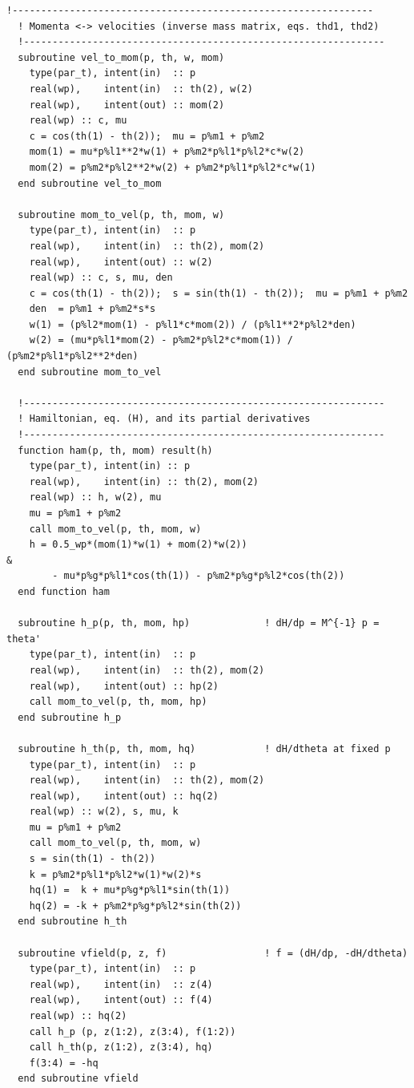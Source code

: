 \documentclass[11pt,a4paper]{book}
\theoremstyle{definition}
\theoremstyle{remark}
\begin{document}
\begin{lstlisting}[language={[95]Fortran},basicstyle=\ttfamily\scriptsize]
  !---------------------------------------------------------------
  ! Momenta <-> velocities (inverse mass matrix, eqs. thd1, thd2)
  !---------------------------------------------------------------
  subroutine vel_to_mom(p, th, w, mom)
    type(par_t), intent(in)  :: p
    real(wp),    intent(in)  :: th(2), w(2)
    real(wp),    intent(out) :: mom(2)
    real(wp) :: c, mu
    c = cos(th(1) - th(2));  mu = p%m1 + p%m2
    mom(1) = mu*p%l1**2*w(1) + p%m2*p%l1*p%l2*c*w(2)
    mom(2) = p%m2*p%l2**2*w(2) + p%m2*p%l1*p%l2*c*w(1)
  end subroutine vel_to_mom

  subroutine mom_to_vel(p, th, mom, w)
    type(par_t), intent(in)  :: p
    real(wp),    intent(in)  :: th(2), mom(2)
    real(wp),    intent(out) :: w(2)
    real(wp) :: c, s, mu, den
    c = cos(th(1) - th(2));  s = sin(th(1) - th(2));  mu = p%m1 + p%m2
    den  = p%m1 + p%m2*s*s
    w(1) = (p%l2*mom(1) - p%l1*c*mom(2)) / (p%l1**2*p%l2*den)
    w(2) = (mu*p%l1*mom(2) - p%m2*p%l2*c*mom(1)) / (p%m2*p%l1*p%l2**2*den)
  end subroutine mom_to_vel

  !---------------------------------------------------------------
  ! Hamiltonian, eq. (H), and its partial derivatives
  !---------------------------------------------------------------
  function ham(p, th, mom) result(h)
    type(par_t), intent(in) :: p
    real(wp),    intent(in) :: th(2), mom(2)
    real(wp) :: h, w(2), mu
    mu = p%m1 + p%m2
    call mom_to_vel(p, th, mom, w)
    h = 0.5_wp*(mom(1)*w(1) + mom(2)*w(2))                              &
        - mu*p%g*p%l1*cos(th(1)) - p%m2*p%g*p%l2*cos(th(2))
  end function ham

  subroutine h_p(p, th, mom, hp)             ! dH/dp = M^{-1} p = theta'
    type(par_t), intent(in)  :: p
    real(wp),    intent(in)  :: th(2), mom(2)
    real(wp),    intent(out) :: hp(2)
    call mom_to_vel(p, th, mom, hp)
  end subroutine h_p

  subroutine h_th(p, th, mom, hq)            ! dH/dtheta at fixed p
    type(par_t), intent(in)  :: p
    real(wp),    intent(in)  :: th(2), mom(2)
    real(wp),    intent(out) :: hq(2)
    real(wp) :: w(2), s, mu, k
    mu = p%m1 + p%m2
    call mom_to_vel(p, th, mom, w)
    s = sin(th(1) - th(2))
    k = p%m2*p%l1*p%l2*w(1)*w(2)*s
    hq(1) =  k + mu*p%g*p%l1*sin(th(1))
    hq(2) = -k + p%m2*p%g*p%l2*sin(th(2))
  end subroutine h_th

  subroutine vfield(p, z, f)                 ! f = (dH/dp, -dH/dtheta)
    type(par_t), intent(in)  :: p
    real(wp),    intent(in)  :: z(4)
    real(wp),    intent(out) :: f(4)
    real(wp) :: hq(2)
    call h_p (p, z(1:2), z(3:4), f(1:2))
    call h_th(p, z(1:2), z(3:4), hq)
    f(3:4) = -hq
  end subroutine vfield


\end{lstlisting}
\end{document}

